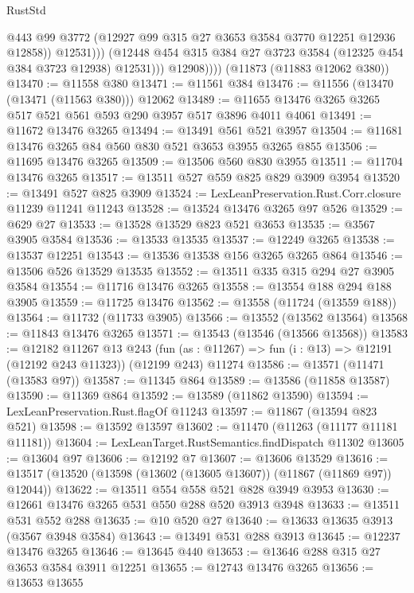 \begin{lexlean}{RustStd}
\begin{coremodule}
                        @443
                        @99
                        @3772
                        (@12927 @99 @315 @27 @3653 @3584 @3770 @12251 @12936 @12858))
                      @12531)))
                (@12448 @454 @315 @384 @27 @3723 @3584 (@12325 @454 @384 @3723 @12938) @12531)))
            @12908))))
    (@11873 (@11883 @12062 @380))
@13470 := @11558 @380
@13471 := @11561 @384
@13476 := @11556 (@13470 (@13471 (@11563 @380))) @12062
@13489 := @11655 @13476 @3265 @3265 @517 @521 @561 @593 @290 @3957 @517 @3896 @4011 @4061
@13491 := @11672 @13476 @3265
@13494 := @13491 @561 @521 @3957
@13504 := @11681 @13476 @3265 @84 @560 @830 @521 @3653 @3955 @3265 @855
@13506 := @11695 @13476 @3265
@13509 := @13506 @560 @830 @3955
@13511 := @11704 @13476 @3265
@13517 := @13511 @527 @559 @825 @829 @3909 @3954
@13520 := @13491 @527 @825 @3909
@13524 := LexLeanPreservation.Rust.Corr.closure @11239 @11241 @11243
@13528 := @13524 @13476 @3265 @97 @526
@13529 := @629 @27
@13533 := @13528 @13529 @823 @521 @3653
@13535 := @3567 @3905 @3584
@13536 := @13533 @13535
@13537 := @12249 @3265
@13538 := @13537 @12251
@13543 := @13536 @13538 @156 @3265 @3265 @864
@13546 := @13506 @526 @13529 @13535
@13552 := @13511 @335 @315 @294 @27 @3905 @3584
@13554 := @11716 @13476 @3265
@13558 := @13554 @188 @294 @188 @3905
@13559 := @11725 @13476
@13562 := @13558 (@11724 (@13559 @188))
@13564 := @11732 (@11733 @3905)
@13566 := @13552 (@13562 @13564)
@13568 := @11843 @13476 @3265
@13571 := @13543 (@13546 (@13566 @13568))
@13583 := @12182
    @11267
    @13
    @243
    (fun (as : @11267) => fun (i : @13) => @12191 (@12192 @243 @11323))
    (@12199 @243)
    @11274
@13586 := @13571 (@11471 (@13583 @97))
@13587 := @11345 @864
@13589 := @13586 (@11858 @13587)
@13590 := @11369 @864
@13592 := @13589 (@11862 @13590)
@13594 := LexLeanPreservation.Rust.flagOf @11243
@13597 := @11867 (@13594 @823 @521)
@13598 := @13592 @13597
@13602 := @11470 (@11263 (@11177 @11181 @11181))
@13604 := LexLeanTarget.RustSemantics.findDispatch @11302
@13605 := @13604 @97
@13606 := @12192 @7
@13607 := @13606 @13529
@13616 := @13517 (@13520 (@13598 (@13602 (@13605 @13607)) (@11867 (@11869 @97)) @12044))
@13622 := @13511 @554 @558 @521 @828 @3949 @3953
@13630 := @12661 @13476 @3265 @531 @550 @288 @520 @3913 @3948
@13633 := @13511 @531 @552 @288
@13635 := @10 @520 @27
@13640 := @13633 @13635 @3913 (@3567 @3948 @3584)
@13643 := @13491 @531 @288 @3913
@13645 := @12237 @13476 @3265
@13646 := @13645 @440
@13653 := @13646 @288 @315 @27 @3653 @3584 @3911 @12251
@13655 := @12743 @13476 @3265
@13656 := @13653 @13655

\end{coremodule}
\end{lexlean}
